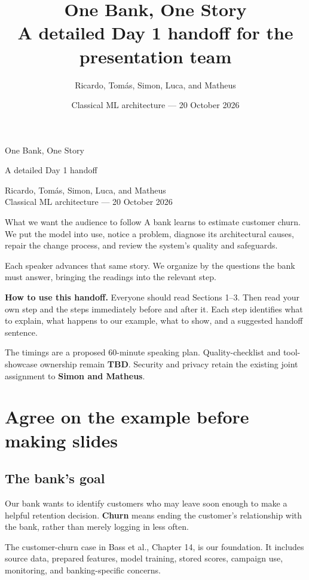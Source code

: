 \documentclass[12pt,a4paper]{article}
\begin{document}
\RaggedRight
\title{One Bank, One Story\\[0.4em]\large A detailed Day 1 handoff for the presentation team}
\author{Ricardo, Tomás, Simon, Luca, and Matheus}
\date{Classical ML architecture --- 20 October 2026}
\begin{center}
{\LARGE One Bank, One Story\par}
{\large A detailed Day 1 handoff\par}
Ricardo, Tomás, Simon, Luca, and Matheus\\
Classical ML architecture --- 20 October 2026
\end{center}

\begin{keybox}{What we want the audience to follow}
A bank learns to estimate customer churn. We put the model into use, notice a problem, diagnose its architectural causes, repair the change process, and review the system's quality and safeguards.

Each speaker advances that same story. We organize by the questions the bank must answer, bringing the readings into the relevant step.
\end{keybox}

\textbf{How to use this handoff.} Everyone should read Sections 1--3. Then read your own step and the steps immediately before and after it. Each step identifies what to explain, what happens to our example, what to show, and a suggested handoff sentence.

The timings are a proposed 60-minute speaking plan. Quality-checklist and tool-showcase ownership remain \textbf{TBD}. Security and privacy retain the existing joint assignment to \textbf{Simon and Matheus}.


\section{Agree on the example before making slides}
\subsection{The bank's goal}
Our bank wants to identify customers who may leave soon enough to make a helpful retention decision. \textbf{Churn} means ending the customer's relationship with the bank, rather than merely logging in less often.

The customer-churn case in Bass et al., Chapter 14, is our foundation. It includes source data, prepared features, model training, stored scores, campaign use, monitoring, and banking-specific concerns.
\end{document}
